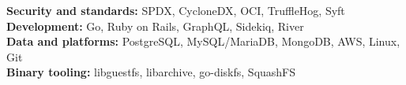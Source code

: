 


\begin{cvparagraph}
\textbf{Security and standards:} SPDX, CycloneDX, OCI, TruffleHog, Syft \\
\textbf{Development:} Go, Ruby on Rails, GraphQL, Sidekiq, River \\
\textbf{Data and platforms:} PostgreSQL, MySQL/MariaDB, MongoDB, AWS, Linux, Git \\
\textbf{Binary tooling:} libguestfs, libarchive, go-diskfs, SquashFS
\end{cvparagraph}
